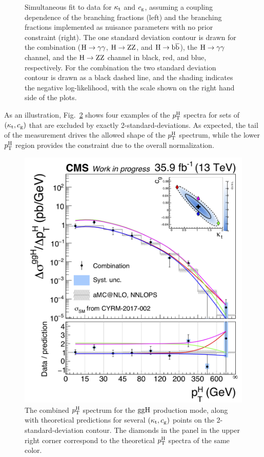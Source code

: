 \begin{figure}[hbtp]
\begin{center}
{        }
    \caption{
        Simultaneous fit to data for $\kappa_{\mathrm{t}}$ and $c_\mathrm{g}$, assuming a coupling dependence of the branching fractions (left) and the branching fractions implemented as nuisance parameters with no prior constraint (right).
        The one standard deviation contour is drawn for the combination ($\mathrm{H}\to\mathrm{\gamma}\mathrm{\gamma}$, $\mathrm{H}\to\mathrm{Z}\mathrm{Z}$, and $\mathrm{H}\to\mathrm{b}\overline{\mathrm{b}}$), the $\mathrm{H}\to\mathrm{\gamma}\mathrm{\gamma}$ channel, and the $\mathrm{H}\to\mathrm{Z}\mathrm{Z}$ channel in black, red, and blue, respectively.
        For the combination the two standard deviation contour is drawn as a black dashed line, and the shading indicates the negative log-likelihood, with the scale shown on the right hand side of the plots.
        }
    \label{fig:ktcg}
  \end{center}
\end{figure}


As an illustration, Fig.~\ref{fig:ktcg-points} shows four examples of the $p_\mathrm{T}^\mathrm{H}$ spectra for sets of $(\kappa_{\mathrm{t}}, c_\mathrm{g})$ that are excluded by exactly 2-standard-deviations.
% 
As expected, the tail of the measurement drives the allowed shape of the $p_\mathrm{T}^\mathrm{H}$ spectrum, while the lower $p_\mathrm{T}^\mathrm{H}$ region provides the constraint due to the overall normalization.


\begin{figure}[hbtp]
  \begin{center}
    \includegraphics[width=0.55\linewidth]{img/interpretation/spectra_pth_ggH_withmulticont.png}
    \caption{
        The combined $p_\mathrm{T}^\mathrm{H}$ spectrum for the $\mathrm{g}\mathrm{g}\mathrm{H}$ production mode, along with theoretical predictions for several $(\kappa_{\mathrm{t}}, c_\mathrm{g})$ points on the 2-standard-deviation contour.
        The diamonds in the panel in the upper right corner correspond to the theoretical $p_\mathrm{T}^\mathrm{H}$ spectra of the same color.
        }
    \label{fig:ktcg-points}
  \end{center}
\end{figure}


